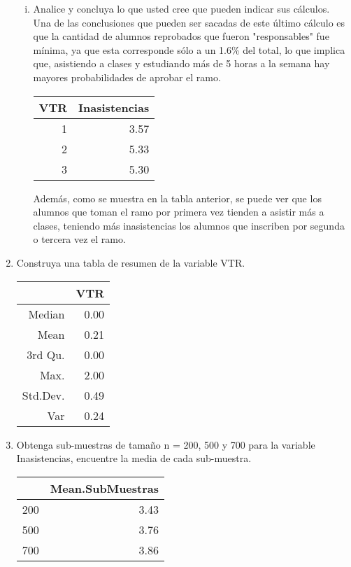 \documentclass[12pt,letterpaper,hidelinks]{article}
\begin{document}
\begin{enumerate}[\hspace{.5cm} a)]
\begin{enumerate}[i)]
\item Analice y concluya lo que usted cree que pueden indicar sus cálculos.
\\
Una de las conclusiones que pueden ser sacadas de este último cálculo es que la cantidad de alumnos reprobados que fueron "responsables" fue mínima, ya que esta corresponde sólo a un 1.6\% del total, lo que implica que, asistiendo a clases y estudiando más de 5 horas a la semana hay mayores probabilidades de aprobar el ramo.

\begin{table}[!ht]
\centering
\begin{tabular}{|rr|}
  \hline
 VTR & Inasistencias \\
  \hline
1 & 3.57 \\
2 & 5.33 \\
3 & 5.30 \\ 
   \hline
\end{tabular}
\end{table}

Además, como se muestra en la tabla anterior, se puede ver que los alumnos que toman el ramo por primera vez tienden a asistir más a clases, teniendo más inasistencias los alumnos que inscriben por segunda o tercera vez el ramo.

\end{enumerate}

\item Construya una tabla de resumen de la variable VTR.
\begin{table}[!ht]
\centering
\begin{tabular}{|rr|}
  \hline
 & VTR \\ 
  \hline
Median & 0.00 \\ 
  Mean & 0.21 \\ 
  3rd Qu. & 0.00 \\ 
  Max. & 2.00 \\ 
  Std.Dev. & 0.49 \\ 
  Var & 0.24 \\ 
   \hline
\end{tabular}
\end{table}

\pagebreak

\item Obtenga sub-muestras de tamaño n = 200, 500 y 700 para la variable Inasistencias, encuentre la media de cada sub-muestra.

\begin{table}[!ht]
\centering
\begin{tabular}{|rr|}
  \hline
 & Mean.SubMuestras \\ 
  \hline
200 & 3.43 \\ 
  500 & 3.76 \\ 
  700 & 3.86 \\ 
   \hline
\end{tabular}
\end{table}

\end{enumerate}
\end{document}

